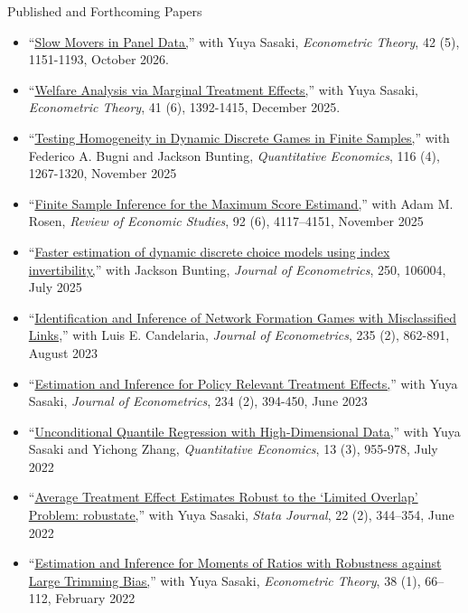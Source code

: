 \documentclass{article}
\begin{document}
\bigskip\noindent Published and Forthcoming Papers
\begin{itemize}
\item[] ``\href{https://doi.org/10.1017/S0266466625100157}{Slow Movers in Panel Data,}''  with Yuya Sasaki, \textit{Econometric Theory}, 42 (5), 1151-1193, October 2026.
\item[] ``\href{https://doi.org/10.1017/S0266466624000227}{Welfare Analysis via Marginal Treatment Effects,}''  with Yuya Sasaki,  \textit{Econometric Theory}, 41 (6), 1392-1415, December 2025.  
\item[] ``\href{https://doi.org/10.3982/QE2059}{Testing Homogeneity in Dynamic Discrete Games in Finite Samples,}''  with Federico A. Bugni and Jackson Bunting, \textit{Quantitative Economics}, 116 (4), 1267-1320, November 2025
\item[] ``\href{https://doi.org/10.1093/restud/rdaf001}{Finite Sample Inference for the Maximum Score Estimand,}''  with Adam M. Rosen, \textit{Review of Economic Studies}, 92 (6), 4117–4151, November 2025
\item[] ``\href{https://doi.org/10.1016/j.jeconom.2025.106004}{Faster estimation of dynamic discrete choice models using index invertibility,}''  with Jackson Bunting, \textit{Journal of Econometrics}, 250, 106004, July 2025
\item[] ``\href{https://doi.org/10.1016/j.jeconom.2022.07.007}{Identification and Inference of Network Formation Games with Misclassified Links,}''  with Luis E. Candelaria,  \textit{Journal of Econometrics}, 235 (2), 862-891, August 2023 
\item[] ``\href{https://doi.org/10.1016/j.jeconom.2021.03.015}{Estimation and Inference for Policy Relevant Treatment Effects,}'' with Yuya Sasaki, \textit{Journal of Econometrics}, 234 (2), 394-450, June 2023 
\item[] ``\href{https://doi.org/10.3982/QE1896}{Unconditional Quantile Regression with High-Dimensional Data,}'' with Yuya Sasaki and Yichong Zhang, \textit{Quantitative Economics}, 13 (3), 955-978, July 2022
\item[] ``\href{https://doi.org/10.1177/1536867X221106402}{Average Treatment Effect Estimates Robust to the `Limited Overlap’ Problem: robustate,}''  with Yuya Sasaki,  \textit{Stata Journal}, 22 (2), 344–354, June 2022
\item[] ``\href{https://doi.org/10.1017/S0266466621000025}{Estimation and Inference for Moments of Ratios with Robustness against Large Trimming Bias,}''  with Yuya Sasaki,   \textit{Econometric Theory}, 38 (1), 66–112, February 2022

\end{itemize}
\end{document}
